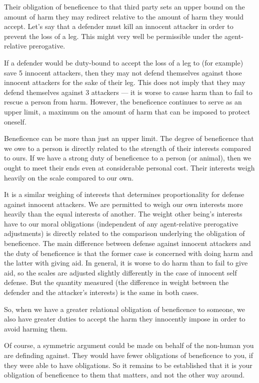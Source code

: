 		Their obligation of beneficence to that third party sets an upper bound
		on the amount of harm they may redirect relative to the amount of harm
		they would accept. Let’s say that a defender must kill an innocent
		attacker in order to prevent the loss of a leg. This might very well
		be permissible under the agent-relative prerogative.

		If a defender would be duty-bound to accept the loss of a leg to (for
		example) save 5 innocent attackers, then they may not defend themselves
		against those innocent attackers for the sake of their leg. This does
		not imply that they may defend themselves against 3 attackers --- it is
		worse to cause harm than to fail to rescue a person from harm. However,
		the beneficence continues to serve as an upper limit, a maximum on the
		amount of harm that can be imposed to protect oneself.

		Beneficence can be more than just an upper limit. The degree of
		beneficence that we owe to a person is directly related to the strength
		of their interests compared to ours. If we have a strong duty of
		beneficence to a person (or animal), then we ought to meet their ends
		even at considerable personal cost. Their interests weigh heavily on
		the scale compared to our own. 

		It is a similar weighing of interests that determines proportionality
		for defense against innocent attackers. We are permitted to weigh our
		own interests more heavily than the equal interests of another. The
		weight other being’s interests have to our moral obligations
		(independent of any agent-relative prerogative adjustments) is directly
		related to the comparison underlying the obligation of beneficence. The
		main difference between defense against innocent attackers and the duty
		of beneficence is that the former case is concerned with doing harm and
		the latter with giving aid. In general, it is worse to do harm than to
		fail to give aid, so the scales are adjusted slightly differently in
		the case of innocent self defense. But the quantity measured (the
		difference in weight between the defender and the attacker’s interests)
		is the same in both cases.

		So, when we have a greater relational obligation of beneficence to
		someone, we also have greater duties to accept the harm they innocently
		impose in order to avoid harming them.

		Of course, a symmetric argument could be made on behalf of the
		non-human you are definding against. They would have fewer obligations
		of beneficence to you, if they were able to have obligations. So it
		remains to be established that it is your obligation of beneficence to
		them that matters, and not the other way around.

